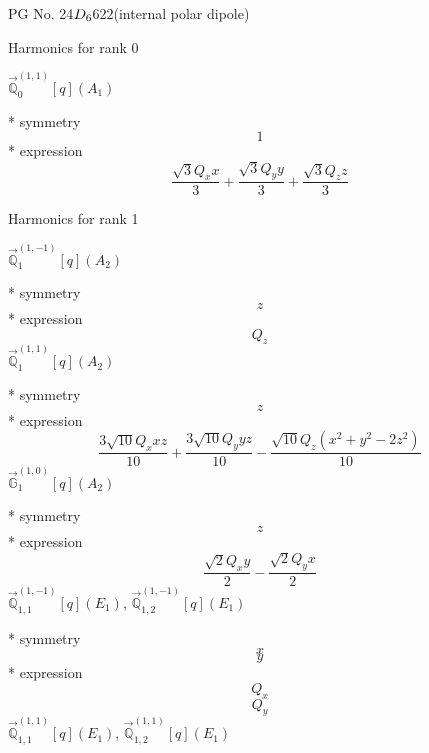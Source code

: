 \documentclass[fleqn,8pt]{jsarticle}
\begin{document}
\setcounter{MaxMatrixCols}{32}

\renewcommand{\tablename}{Table~}
\renewcommand{\figurename}{Figure~}
\begin{center}
\LARGE
PG No. 24\quad$D_{\rm 6}$\quad$622$\quad[ hexagonal ] (internal polar dipole)
\end{center}

\noindent * Harmonics for rank 0

\noindent\quad $\vec{\mathbb{Q}}_{0}^{(1,1)}[q](A_{1})$

\noindent\quad ** symmetry
\begin{dmath*}
1
\end{dmath*}
\noindent\quad ** expression
\begin{dmath*}
\frac{\sqrt{3} Q_{x} x}{3} + \frac{\sqrt{3} Q_{y} y}{3} + \frac{\sqrt{3} Q_{z} z}{3}
\end{dmath*}

\noindent * Harmonics for rank 1

\noindent\quad $\vec{\mathbb{Q}}_{1}^{(1,-1)}[q](A_{2})$

\noindent\quad ** symmetry
\begin{dmath*}
z
\end{dmath*}
\noindent\quad ** expression
\begin{dmath*}
Q_{z}
\end{dmath*}
\noindent\quad $\vec{\mathbb{Q}}_{1}^{(1,1)}[q](A_{2})$

\noindent\quad ** symmetry
\begin{dmath*}
z
\end{dmath*}
\noindent\quad ** expression
\begin{dmath*}
\frac{3 \sqrt{10} Q_{x} x z}{10} + \frac{3 \sqrt{10} Q_{y} y z}{10} - \frac{\sqrt{10} Q_{z} \left(x^{2} + y^{2} - 2 z^{2}\right)}{10}
\end{dmath*}
\noindent\quad $\vec{\mathbb{G}}_{1}^{(1,0)}[q](A_{2})$

\noindent\quad ** symmetry
\begin{dmath*}
z
\end{dmath*}
\noindent\quad ** expression
\begin{dmath*}
\frac{\sqrt{2} Q_{x} y}{2} - \frac{\sqrt{2} Q_{y} x}{2}
\end{dmath*}
\noindent\quad $\vec{\mathbb{Q}}_{1,1}^{(1,-1)}[q](E_{1})$, $\vec{\mathbb{Q}}_{1,2}^{(1,-1)}[q](E_{1})$

\noindent\quad ** symmetry
\begin{dmath*}
x
\end{dmath*}
\begin{dmath*}
y
\end{dmath*}
\noindent\quad ** expression
\begin{dmath*}
Q_{x}
\end{dmath*}
\begin{dmath*}
Q_{y}
\end{dmath*}
\noindent\quad $\vec{\mathbb{Q}}_{1,1}^{(1,1)}[q](E_{1})$, $\vec{\mathbb{Q}}_{1,2}^{(1,1)}[q](E_{1})$
\end{document}
